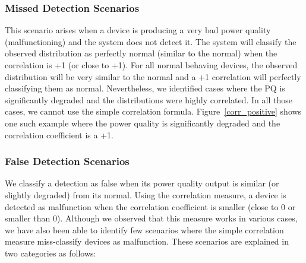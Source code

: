 \documentclass[12pt,oneside]{book}
\begin{document}
\subsubsection{Missed Detection Scenarios}
This scenario arises when a device is producing a very bad power quality (malfunctioning) and the system does not detect it. The system will classify the observed distribution as perfectly normal (similar to the normal) when the correlation is +1 (or close to +1). For all normal behaving devices, the observed distribution will be very similar to the normal and a +1 correlation will perfectly classifying them as normal. Nevertheless, we identified cases where the PQ is significantly degraded and the distributions were highly correlated. In all those cases, we cannot use the simple correlation formula. Figure~\ref{corr_positive} shows one such example where the power quality is significantly degraded and the correlation coefficient is a +1.

\subsubsection{False Detection Scenarios}
We classify a detection as false when its power quality output is similar (or slightly degraded) from its normal. Using the correlation measure, a device is detected as malfunction when the correlation coefficient is smaller (close to 0 or smaller than 0). Although we observed that this measure works in various cases, we have also been able to identify few scenarios where the simple correlation measure miss-classify devices as malfunction. These scenarios are explained in two categories as follows:
\end{document}
